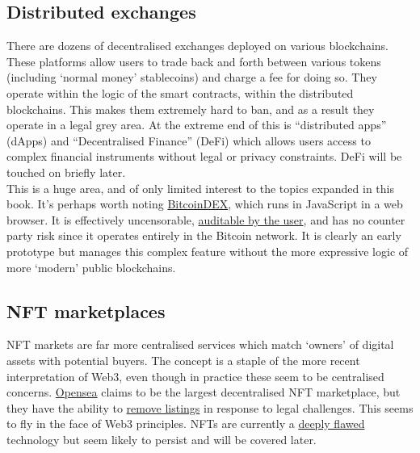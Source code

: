 \subsection{Distributed exchanges}
There are dozens of decentralised exchanges deployed on various blockchains. These platforms allow users to trade back and forth between various tokens (including `normal money' stablecoins) and charge a fee for doing so. They operate within the logic of the smart contracts, within the distributed blockchains. This makes them extremely hard to ban, and as a result they operate in a legal grey area. At the extreme end of this is ``distributed apps'' (dApps) and ``Decentralised Finance'' (DeFi) which allows users access to complex financial instruments without legal or privacy constraints. DeFi will be touched on briefly later.\\
This is a huge area, and of only limited interest to the topics expanded in this book. It's perhaps worth noting \href{https://bitcoin-dex.net/about/index.html}{BitcoinDEX}, which runs in JavaScript in a web browser. It is effectively uncensorable, \href{https://bitcoin-dex.net/tokens.js}{auditable by the user}, and has no counter party risk since it operates entirely in the Bitcoin network. It is clearly an early prototype but manages this complex feature without the more expressive logic of more `modern' public blockchains.
\subsection{NFT marketplaces}
NFT markets are far more centralised services which match `owners' of digital assets with potential buyers. The concept is a staple of the more recent interpretation of Web3, even though in practice these seem to be centralised concerns. \href{https://opensea.io/}{Opensea} claims to be the largest decentralised NFT marketplace, but they have the ability to \href{https://thedefiant.io/sad-frogs-delisted-opensea/}{remove listings} in response to legal challenges. This seems to fly in the face of Web3 principles. NFTs are currently a \href{https://tante.cc/2021/12/17/the-third-web/}{deeply flawed} technology but seem likely to persist and will be covered later.

